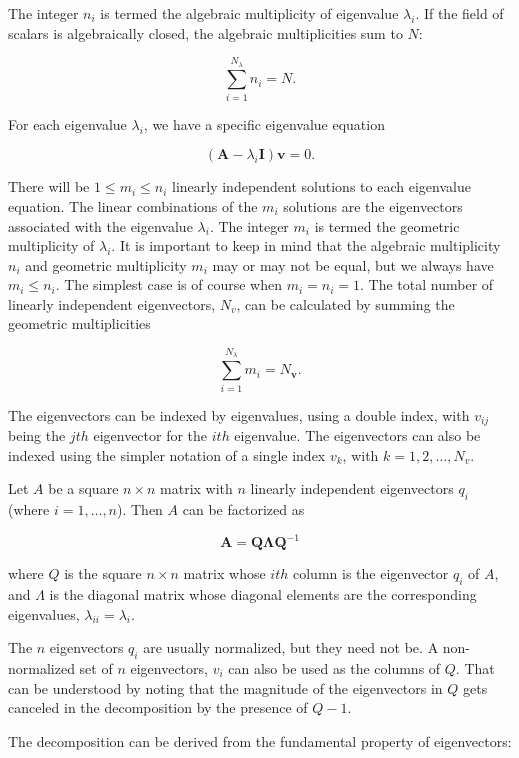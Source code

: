 \documentclass[11pt]{article}
\begin{document}
\begin{multicols}{3}
The integer $n_i$ is termed the algebraic multiplicity of eigenvalue $\lambda_i$. If the field of scalars is algebraically closed, the algebraic multiplicities sum to $N$:

$$\sum \limits _{i=1}^{N_{\lambda }}{n_{i}}=N.$$

For each eigenvalue $\lambda_i$, we have a specific eigenvalue equation

$$ \left(\mathbf {A} -\lambda _{i}\mathbf {I} \right)\mathbf {v} =0.$$

There will be $1 \leq m_i \leq n_i$ linearly independent solutions to each eigenvalue equation. The linear combinations of the $m_i$ solutions are the eigenvectors associated with the eigenvalue $\lambda_i$. The integer $m_i$ is termed the geometric multiplicity of $\lambda_i$. It is important to keep in mind that the algebraic multiplicity $n_i$ and geometric multiplicity $m_i$ may or may not be equal, but we always have $m_i \leq n_i$. The simplest case is of course when $m_i = n_i = 1$. The total number of linearly independent eigenvectors, $N_v$, can be calculated by summing the geometric multiplicities

$$\sum \limits _{i=1}^{N_{\lambda }}{m_{i}}=N_{\mathbf {v} }.$$

The eigenvectors can be indexed by eigenvalues, using a double index, with $v_{ij}$ being the $jth$ eigenvector for the $ith$ eigenvalue. The eigenvectors can also be indexed using the simpler notation of a single index $v_k$, with $k = 1, 2, \dots, N_v.$

Let $A$ be a square $n \times n$ matrix with $n$ linearly independent eigenvectors $q_i$ (where $i = 1, \dots, n$). Then $A$ can be factorized as

$$ \mathbf {A} =\mathbf {Q} \mathbf {\Lambda } \mathbf {Q} ^{-1}$$

where $Q$ is the square $n \times n$ matrix whose $ith$ column is the eigenvector $q_i$ of $A$, and $\Lambda$ is the diagonal matrix whose diagonal elements are the corresponding eigenvalues, $\lambda_{ii} = \lambda_i$.

The $n$ eigenvectors $q_i$ are usually normalized, but they need not be. A non-normalized set of $n$ eigenvectors, $v_i$ can also be used as the columns of $Q$. That can be understood by noting that the magnitude of the eigenvectors in $Q$ gets canceled in the decomposition by the presence of $Q-1$.

The decomposition can be derived from the fundamental property of eigenvectors:


\end{multicols}
\end{document}
